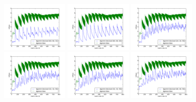 \documentclass[12pt]{article}
\begin{document}
	\includegraphics[width=0.25\textwidth]{graphs/profiles/PROFILE_OUTUT_64_32.pdf} 
	\includegraphics[width=0.25\textwidth]{graphs/profiles/PROFILE_OUTUT_64_64.pdf} 
	\includegraphics[width=0.25\textwidth]{graphs/profiles/PROFILE_OUTUT_24_56.pdf}  
	\includegraphics[width=0.25\textwidth]{graphs/profiles/PROFILE_OUTUT_32_56.pdf}  
	\includegraphics[width=0.25\textwidth]{graphs/profiles/PROFILE_OUTUT_32_56.pdf} 
	\includegraphics[width=0.25\textwidth]{graphs/profiles/PROFILE_OUTUT_40_56.pdf} 
\end{document}
